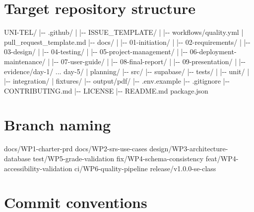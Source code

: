 \documentclass[
  10pt,
  a4paper,
  oneside]{report}
\newenvironment{Shaded}{}{}
\newcommand{\NormalTok}[1]{#1}
\begin{document}
\section{Target repository
structure}\label{91-target-repository-structure}

\begin{Shaded}
\begin{Highlighting}[]
\NormalTok{UNI{-}TEL/}
\NormalTok{|{-}{-} .github/}
\NormalTok{|   |{-}{-} ISSUE\_TEMPLATE/}
\NormalTok{|   |{-}{-} workflows/quality.yml}
\NormalTok{|   \textasciigrave{}{-}{-} pull\_request\_template.md}
\NormalTok{|{-}{-} docs/}
\NormalTok{|   |{-}{-} 01{-}initiation/}
\NormalTok{|   |{-}{-} 02{-}requirements/}
\NormalTok{|   |{-}{-} 03{-}design/}
\NormalTok{|   |{-}{-} 04{-}testing/}
\NormalTok{|   |{-}{-} 05{-}project{-}management/}
\NormalTok{|   |{-}{-} 06{-}deployment{-}maintenance/}
\NormalTok{|   |{-}{-} 07{-}user{-}guide/}
\NormalTok{|   |{-}{-} 08{-}final{-}report/}
\NormalTok{|   |{-}{-} 09{-}presentation/}
\NormalTok{|   |{-}{-} evidence/day{-}1/ ... day{-}5/}
\NormalTok{|   \textasciigrave{}{-}{-} planning/}
\NormalTok{|{-}{-} src/}
\NormalTok{|{-}{-} supabase/}
\NormalTok{|{-}{-} tests/}
\NormalTok{|   |{-}{-} unit/}
\NormalTok{|   |{-}{-} integration/}
\NormalTok{|   \textasciigrave{}{-}{-} fixtures/}
\NormalTok{|{-}{-} output/pdf/}
\NormalTok{|{-}{-} .env.example}
\NormalTok{|{-}{-} .gitignore}
\NormalTok{|{-}{-} CONTRIBUTING.md}
\NormalTok{|{-}{-} LICENSE}
\NormalTok{|{-}{-} README.md}
\NormalTok{\textasciigrave{}{-}{-} package.json}
\end{Highlighting}
\end{Shaded}

\section{Branch naming}\label{92-branch-naming}

\begin{Shaded}
\begin{Highlighting}[]
\NormalTok{docs/WP1{-}charter{-}prd}
\NormalTok{docs/WP2{-}srs{-}use{-}cases}
\NormalTok{design/WP3{-}architecture{-}database}
\NormalTok{test/WP5{-}grade{-}validation}
\NormalTok{fix/WP4{-}schema{-}consistency}
\NormalTok{feat/WP4{-}accessibility{-}validation}
\NormalTok{ci/WP6{-}quality{-}pipeline}
\NormalTok{release/v1.0.0{-}se{-}class}
\end{Highlighting}
\end{Shaded}

\section{Commit conventions}\label{93-commit-conventions}
\end{document}
